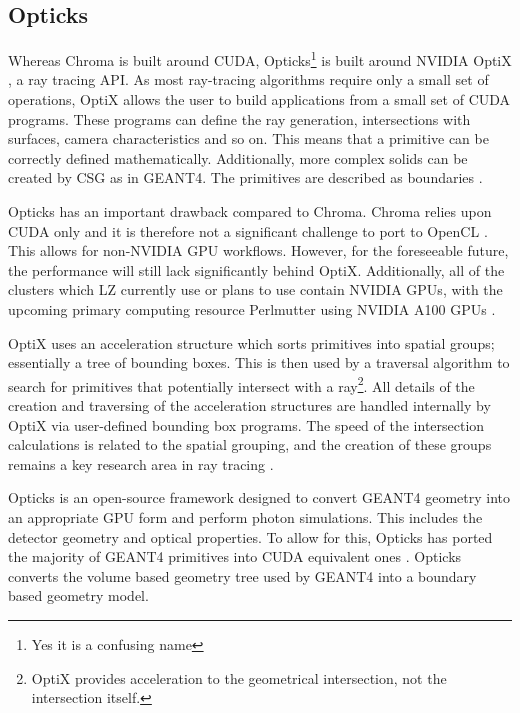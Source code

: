 \subsection{Opticks}
\par
Whereas Chroma is built around CUDA, Opticks\footnote{Yes it is a confusing name} is built around NVIDIA OptiX \cite{nvidia_optix_paper_ref}, a ray tracing API.
As most ray-tracing algorithms require only a small set of operations, OptiX allows the user to build applications from a small set of CUDA programs.
These programs can define the ray generation, intersections with surfaces, camera characteristics and so on.
This means that a primitive can be correctly defined mathematically.
Additionally, more complex solids can be created by CSG as in GEANT4.
The primitives are described as boundaries \cite{real_time_collision_detection_ref}.
\par
Opticks has an important drawback compared to Chroma.
Chroma relies upon CUDA only and it is therefore not a significant challenge to port to OpenCL \cite{chroma_whitepaper_ref}.
This allows for non-NVIDIA GPU workflows.
However, for the foreseeable future, the performance will still lack significantly behind OptiX.
Additionally, all of the clusters which LZ currently use or plans to use contain NVIDIA GPUs, with the upcoming primary computing resource Perlmutter using NVIDIA A100 GPUs \cite{perlmutter_ref}.
\par
OptiX uses an acceleration structure which sorts primitives into spatial groups; essentially a tree of bounding boxes.
This is then used by a traversal algorithm to search for primitives that potentially intersect with a ray\footnote{OptiX provides acceleration to the geometrical intersection, not the intersection itself.}.
All details of the creation and traversing of the acceleration structures are handled internally by OptiX via user-defined bounding box programs.
The speed of the intersection calculations is related to the spatial grouping, and the creation of these groups remains a key research area in ray tracing \cite{NVIDIA_OptiX_GPU_Ray_Tracing_ACM_paper_ref,accelerated_bvh_ref}.
\par
Opticks is an open-source framework designed to convert GEANT4 geometry into an appropriate GPU form and perform photon simulations.
This includes the detector geometry and optical properties.
To allow for this, Opticks has ported the majority of GEANT4 primitives into CUDA equivalent ones \cite{Opticks_CHEP_2019_ref}.
Opticks converts the volume based geometry tree used by GEANT4 into a boundary based geometry model.
